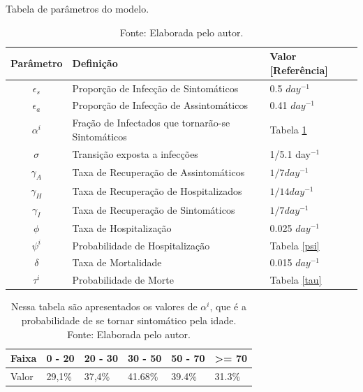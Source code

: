 \begin{table}[H]
  \caption{Tabela de parâmetros do modelo.}
  \begin{tabular}{cll}
  Parâmetro & Definição & Valor [Referência] \\
  \hline
  \rowcolor{Gray}
  $\epsilon_s$ & Proporção de Infecção de Sintomáticos & 0.5 $day^{-1}$\\
  $\epsilon_a$ & Proporção de Infecção de Assintomáticos& 0.41 $day^{-1}$\\ 
  \rowcolor{Gray}
  $\alpha^i$   & Fração de Infectados que tornarão-se Sintomáticos & Tabela \ref{alpha} \cite{Jung2020}\\
  $\sigma$     & Transição exposta a infecções& 1/5.1 day$^{-1}$\\
  \rowcolor{Gray}
  $\gamma_A$   & Taxa de Recuperação de Assintomáticos& $1/7 day^{-1}$\\
  $\gamma_H$   & Taxa de Recuperação de Hospitalizados& $1/14 day^{-1}$\\
  \rowcolor{Gray}
  $\gamma_I$   & Taxa de Recuperação de Sintomáticos & $1/7 day^{-1}$\\
  $\phi$     & Taxa de Hospitalização & 0.025 $day^{-1}$\\
  \rowcolor{Gray}
  $\psi^i$   & Probabilidade de Hospitalização & Tabela \ref{psi}\\
  $\delta$   & Taxa de Mortalidade & 0.015 $day^{-1}$\\
  \rowcolor{Gray}
  $\tau^i$   & Probabilidade de Morte & Tabela \ref{tau}
  \end{tabular}

  \caption*{Fonte: Elaborada pelo autor.}

\end{table}


\begin{table}[H]
  \centering
  \begin{tabular}{llllll}
  Faixa & 0 - 20 & 20 - 30 & 30 - 50 & 50 - 70 & \textgreater{}= 70 \\
  \hline
  Valor & 29,1\% & 37,4\%  & 41.68\% & 39.4\%  & 31.3\%            
  \end{tabular}

  \caption{Nessa tabela são apresentados os valores de $\alpha^i$, que é a probabilidade de se tornar sintomático pela idade. \\Fonte: Elaborada pelo autor.}

  \label{alpha}

\end{table}

